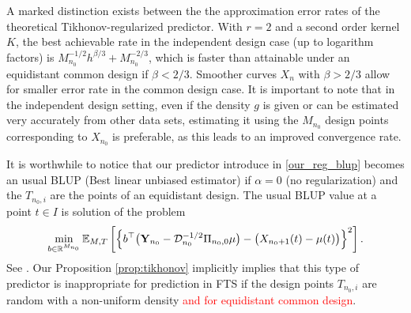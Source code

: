 \documentclass{article}
\begin{document}
\medskip

\begin{remark}
A marked distinction exists between the the approximation error rates of the theoretical Tikhonov-regularized predictor. With $r=2$  and a second order kernel $K$, the best achievable rate in the independent design case  (up to logarithm factors) is $M_{n_0}^{-1/2} h^{\beta/3} + M_{n_0}^{-2/3}$, which is faster than attainable under an equidistant  common design if $\beta <2/3$. Smoother curves $X_n$ with $\beta>2/3$ allow for smaller error rate in the common design case. It is important to note that in the independent design setting, even if the density $g$ is given or can be estimated very accurately from other data sets, estimating it using the $M_{n_0}$ design points corresponding to $X_{n_0}$ is 
preferable, as this leads to an improved convergence rate.
\end{remark}

\medskip

\begin{remark}
It is worthwhile to notice that our predictor introduce in \eqref{our_reg_blup} becomes an usual BLUP (Best linear unbiased estimator) if $\alpha=0$ (no regularization) and the $T_{n_0,i}$ are the points of an equidistant design. 
The usual BLUP value at a point $t\in I$ is solution of the problem  
$$
\min_{b\in\mathbb{R}^{M_{n_0}}} \mathbb{E}_{M,T} \left[ \left\{ b^\top \big( \mathbf{Y}_{n_0}-\mathcal{D}_{n_0}^{-1/2}\Pi_{n_0,0}\mu\big)- \big(X_{n_0+1}(t) - \mu(t)\big)\right\}^2\right].
$$	
See  \cite{Robinson1991blup}. Our Proposition \ref{prop:tikhonov} implicitly implies that this type of predictor is inappropriate for prediction in FTS if the design points $T_{n_0,i}$ are random with a non-uniform density \textcolor{red}{and for equidistant common design}. 
\end{remark}

\medskip
\end{document}
